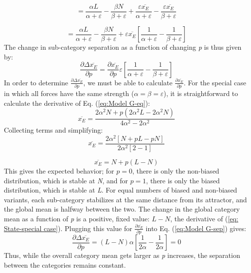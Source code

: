 \begin{equation}
=\frac{\alpha L}{\alpha+\varepsilon}-\frac{\beta N}{\beta+\varepsilon}+\frac{\varepsilon\overline{x_{E}}}{\alpha+\varepsilon}-\frac{\varepsilon\overline{x_{E}}}{\beta+\varepsilon}
\end{equation}

\begin{equation}
=\frac{\alpha L}{\alpha+\varepsilon}-\frac{\beta N}{\beta+\varepsilon}+\varepsilon\overline{x_{E}}\left[\frac{1}{\alpha+\varepsilon}-\frac{1}{\beta+\varepsilon}\right]
\end{equation}
The change in sub-category separation as a function of changing \emph{p}
is thus given by:
\begin{equation}
\frac{\partial\Delta\overline{x_{E}}}{\partial p}=\frac{\partial\overline{x_{E}}}{\partial p}\varepsilon\left[\frac{1}{\alpha+\varepsilon}-\frac{1}{\beta+\varepsilon}\right]\label{eq:Model G-sep}
\end{equation}
In order to determine $\frac{\partial\Delta\overline{x_{E}}}{\partial p}$,
we must be able to calculate $\frac{\partial\overline{x_{E}}}{\partial p}$.
For the special case in which all forces have the same strength ($\alpha=\beta=\varepsilon$),
it is straightforward to calculate the derivative of Eq. (\ref{eq:Model G-eq}):
\begin{equation}
\overline{x_{E}}=\frac{2\alpha^{2}N+p(2\alpha^{2}L-2\alpha^{2}N)}{4\alpha^{2}-2\alpha^{2}}
\end{equation}
Collecting terms and simplifying:
\begin{equation}
\overline{x_{E}}=\frac{2\alpha^{2}[N+pL-pN]}{2\alpha^{2}[2-1]}
\end{equation}

\begin{equation}
\overline{x_{E}}=N+p(L-N)\label{eq: State-special case}
\end{equation}
This gives the expected behavior; for $p=0$, there is only the non-biased
distribution, which is stable at \emph{N}, and for $p=1$, there is
only the biased distribution, which is stable at \emph{L}. For equal
numbers of biased and non-biased variants, each sub-category stabilizes
at the same distance from its attractor, and the global mean is halfway
between the two. The change in the global category mean as a function
of \emph{p} is a positive, fixed value: $L-N$, the derivative of
(\ref{eq: State-special case}). Plugging this value for $\frac{\partial\overline{x_{E}}}{\partial p}$
into Eq. (\ref{eq:Model G-sep}) gives:
\begin{equation}
\frac{\partial\Delta\overline{x_{E}}}{\partial p}=(L-N)\alpha\left[\frac{1}{2\alpha}-\frac{1}{2\alpha}\right]=0\label{eq:separation-special case}
\end{equation}
Thus, while the overall category mean gets larger as \emph{p} increases,
the separation between the categories remains constant. 


